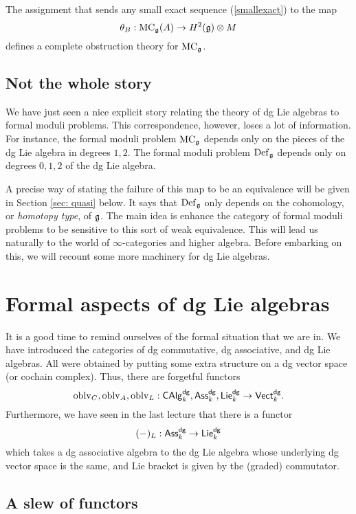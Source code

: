 \documentclass[11pt]{amsart}
\def\dgVect{{\sf Vect}^{\sf dg}}
\def\dgLie{{\sf Lie}^{\sf dg}}
\def\dgAss{{\sf Ass}^{\sf dg}}
\def\dgCAlg{{\sf CAlg}^{\sf dg}}
\begin{document}
\begin{prop}
The assignment that sends any small exact sequence (\ref{smallexact}) to the map
\[
\theta_B : {\rm MC}_\mathfrak g(A) \to H^2(\mathfrak g) \otimes M
\]
defines a complete obstruction theory for ${\rm MC}_\mathfrak g$. 
\end{prop}

\subsection{Not the whole story}

We have just seen a nice explicit story relating the theory of dg Lie algebras to formal moduli problems. 
This correspondence, however, loses a lot of information.
For instance, the formal moduli problem ${\rm MC}_\mathfrak g$ depends only on the pieces of the dg Lie algebra in degrees $1, 2$.
The formal moduli problem ${\rm Def}_\mathfrak g$ depends only on degrees $0,1,2$ of the dg Lie algebra. 

A precise way of stating the failure of this map to be an equivalence will be given in Section \ref{sec: quasi} below.
It says that ${\rm Def}_\mathfrak g$ only depends on the cohomology, or {\em homotopy type}, of $\mathfrak g$.
The main idea is enhance the category of formal moduli problems to be sensitive to this sort of weak equivalence. 
This will lead us naturally to the world of $\infty$-categories and higher algebra. 
Before embarking on this, we will recount some more machinery for dg Lie algebras. 

\section{Formal aspects of dg Lie algebras}

\def\oblv{{\rm oblv}}

It is a good time to remind ourselves of the formal situation that we are in. 
We have introduced the categories of dg commutative, dg associative, and dg Lie algebras.
All were obtained by putting some extra structure on a dg vector space (or cochain complex).
Thus, there are forgetful functors
\[
\oblv_{C}, \oblv_{A}, \oblv_L : \dgCAlg_k, \dgAss_k, \dgLie_k \to \dgVect_k .
\] 
Furthermore, we have seen in the last lecture that there is a functor 
\[
(-)_L : \dgAss_k \to \dgLie_k
\]
which takes a dg associative algebra to the dg Lie algebra whose underlying dg vector space is the same, and Lie bracket is given by the (graded) commutator. 

\subsection{A slew of functors}
\def\Tens{{\rm Tens}}
\end{document}
